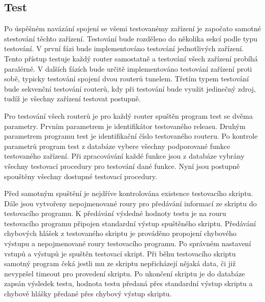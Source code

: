 \subsection{Test}
Po úspěšném navázání spojení se všemi testovanémy zařízení je započato samotné stestování těchto zařízení. Testování bude rozděleno do několika sekcí podle typu testování. V první fázi bude implementováno testování jednotlivých zařízení. Tento přístup testuje každý router samostatně a testování všech zařízení probíhá paralérně. V dalších fázích bude určitě implementováno testování zařízení proti sobě, typicky testování spojení dvou routerů tunelem. Třetím typem testování bude sekvenční testování routerů, kdy při testování bude využit jedinečný zdroj, tudíž je všechny zařízení testovat postupně.

Pro testování všech routerů je pro každý router spuštěn program test se dvěma parametry. Prvním parametrem je identifikátor testovaného releasu. Druhým parametrem programu test je identifikační číslo testovaného routeru. Po kontrole parametrů program test z databáze vybere všechny podporované funkce testovaného zařízení. Při zpracovávání každé funkce jsou z databáze vybrány všechny testovací procedury pro testování dané funkce. Nyní jsou postupně spouštěny všechny dostupné testovací procedury.

Před samotným spuštění je nejdříve kontrolována existence testovacího skriptu. Dále jsou vytvořeny nepojmenované roury pro předávání informací ze skriptu do testovacího programu. K předávání výsledné hodnoty testu je na rouru testovacího programu připojen standardní výstup spuštěného skriptu. Předávání chybových hlášek z testovaného skriptu je prováděno propojení chybového výstupu a nepojmenované roury testovacího programu. Po správném nastavení vstupů a výstupů je spuštěn testovací skript. Při běhu testovacího skriptu samotný program čeká jestli mu ze skriptu nepřicházejí nějaká data, či již nevypršel timeout pro provedení skriptu. Po ukončení skriptu je do databáze zapsán výsledek testu, hodnota testu předaná přes standardní výstup skriptu a chybové hlášky předané přes chybový výstup skriptu. 



